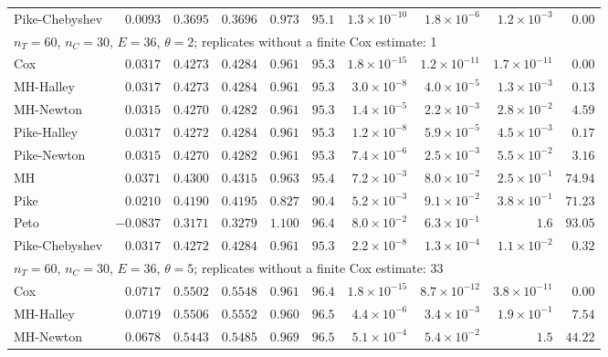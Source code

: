 \begin{landscape}
\begin{longtable}{lrrrrrrrrr}
Pike-Chebyshev & $0.0093$ & $0.3695$ & $0.3696$ & $0.973$ & $95.1$ & $1.3 \times 10^{-10}$ & $1.8 \times 10^{-6}$ & $1.2 \times 10^{-3}$ & $0.00$ \\
\multicolumn{10}{l}{$n_T = 60$, $n_C = 30$, $E = 36$, $\theta = 2$; replicates without a finite Cox estimate: 1} \\
Cox & $0.0317$ & $0.4273$ & $0.4284$ & $0.961$ & $95.3$ & $1.8 \times 10^{-15}$ & $1.2 \times 10^{-11}$ & $1.7 \times 10^{-11}$ & $0.00$ \\
MH-Halley & $0.0317$ & $0.4273$ & $0.4284$ & $0.961$ & $95.3$ & $3.0 \times 10^{-8}$ & $4.0 \times 10^{-5}$ & $1.3 \times 10^{-3}$ & $0.13$ \\
MH-Newton & $0.0315$ & $0.4270$ & $0.4282$ & $0.961$ & $95.3$ & $1.4 \times 10^{-5}$ & $2.2 \times 10^{-3}$ & $2.8 \times 10^{-2}$ & $4.59$ \\
Pike-Halley & $0.0317$ & $0.4272$ & $0.4284$ & $0.961$ & $95.3$ & $1.2 \times 10^{-8}$ & $5.9 \times 10^{-5}$ & $4.5 \times 10^{-3}$ & $0.17$ \\
Pike-Newton & $0.0315$ & $0.4270$ & $0.4282$ & $0.961$ & $95.3$ & $7.4 \times 10^{-6}$ & $2.5 \times 10^{-3}$ & $5.5 \times 10^{-2}$ & $3.16$ \\
MH & $0.0371$ & $0.4300$ & $0.4315$ & $0.963$ & $95.4$ & $7.2 \times 10^{-3}$ & $8.0 \times 10^{-2}$ & $2.5 \times 10^{-1}$ & $74.94$ \\
Pike & $0.0210$ & $0.4190$ & $0.4195$ & $0.827$ & $90.4$ & $5.2 \times 10^{-3}$ & $9.1 \times 10^{-2}$ & $3.8 \times 10^{-1}$ & $71.23$ \\
Peto & $-0.0837$ & $0.3171$ & $0.3279$ & $1.100$ & $96.4$ & $8.0 \times 10^{-2}$ & $6.3 \times 10^{-1}$ & $1.6$ & $93.05$ \\
Pike-Chebyshev & $0.0317$ & $0.4272$ & $0.4284$ & $0.961$ & $95.3$ & $2.2 \times 10^{-8}$ & $1.3 \times 10^{-4}$ & $1.1 \times 10^{-2}$ & $0.32$ \\
\multicolumn{10}{l}{$n_T = 60$, $n_C = 30$, $E = 36$, $\theta = 5$; replicates without a finite Cox estimate: 33} \\
Cox & $0.0717$ & $0.5502$ & $0.5548$ & $0.961$ & $96.4$ & $1.8 \times 10^{-15}$ & $8.7 \times 10^{-12}$ & $3.8 \times 10^{-11}$ & $0.00$ \\
MH-Halley & $0.0719$ & $0.5506$ & $0.5552$ & $0.960$ & $96.5$ & $4.4 \times 10^{-6}$ & $3.4 \times 10^{-3}$ & $1.9 \times 10^{-1}$ & $7.54$ \\
MH-Newton & $0.0678$ & $0.5443$ & $0.5485$ & $0.969$ & $96.5$ & $5.1 \times 10^{-4}$ & $5.4 \times 10^{-2}$ & $1.5$ & $44.22$ \\

\end{longtable}
\end{landscape}
